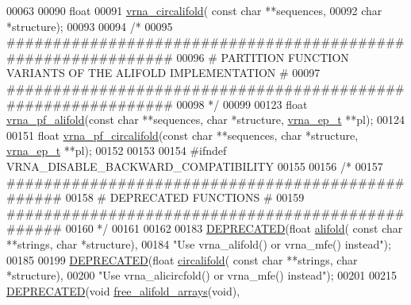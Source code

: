 \begin{DoxyCode}
00063 
00090 \textcolor{keywordtype}{float}
00091 \mbox{\hyperlink{group__consensus__mfe__fold_ga17a1be7490468c29c335ba9bffacba53}{vrna\_circalifold}}( \textcolor{keyword}{const} \textcolor{keywordtype}{char} **sequences,
00092                   \textcolor{keywordtype}{char} *structure);
00093 
00094 \textcolor{comment}{/*}
00095 \textcolor{comment}{#############################################################}
00096 \textcolor{comment}{# PARTITION FUNCTION VARIANTS OF THE ALIFOLD IMPLEMENTATION #}
00097 \textcolor{comment}{#############################################################}
00098 \textcolor{comment}{*/}
00099 
00123 \textcolor{keywordtype}{float} \mbox{\hyperlink{group__consensus__pf__fold_ga374e31a0f326b2c5da5b84e143a63f38}{vrna\_pf\_alifold}}(\textcolor{keyword}{const} \textcolor{keywordtype}{char} **sequences, \textcolor{keywordtype}{char} *structure, 
      \mbox{\hyperlink{group__struct__utils_structvrna__elem__prob__s}{vrna\_ep\_t}} **pl);
00124 
00151 \textcolor{keywordtype}{float} \mbox{\hyperlink{group__consensus__pf__fold_gab70fe6c9a78b79cc5669881720926e1d}{vrna\_pf\_circalifold}}(\textcolor{keyword}{const} \textcolor{keywordtype}{char} **sequences, \textcolor{keywordtype}{char} *structure, 
      \mbox{\hyperlink{group__struct__utils_structvrna__elem__prob__s}{vrna\_ep\_t}} **pl);
00152 
00153 
00154 \textcolor{preprocessor}{#ifndef VRNA\_DISABLE\_BACKWARD\_COMPATIBILITY}
00155 
00156 \textcolor{comment}{/*}
00157 \textcolor{comment}{#################################################}
00158 \textcolor{comment}{# DEPRECATED FUNCTIONS                          #}
00159 \textcolor{comment}{#################################################}
00160 \textcolor{comment}{*/}
00161 
00162 
00183 \mbox{\hyperlink{alifold_8h_aab347a3c03fbe8e7319551b9fa0cce4a}{DEPRECATED}}(\textcolor{keywordtype}{float} \mbox{\hyperlink{group__consensus__mfe__fold_ga4cf00f0659e5f0480335d69e797f05b1}{alifold}}( \textcolor{keyword}{const} \textcolor{keywordtype}{char} **strings, \textcolor{keywordtype}{char} *structure),
00184           \textcolor{stringliteral}{"Use vrna\_alifold() or vrna\_mfe() instead"});
00185 
00199 \mbox{\hyperlink{alifold_8h_aab347a3c03fbe8e7319551b9fa0cce4a}{DEPRECATED}}(\textcolor{keywordtype}{float} \mbox{\hyperlink{group__consensus__mfe__fold_gadbd3b0b1c144cbfb4efe704b2b260f96}{circalifold}}( \textcolor{keyword}{const} \textcolor{keywordtype}{char} **strings, \textcolor{keywordtype}{char} *structure),
00200           \textcolor{stringliteral}{"Use vrna\_alicircfold() or vrna\_mfe() instead"});
00201 
00215 \mbox{\hyperlink{alifold_8h_aab347a3c03fbe8e7319551b9fa0cce4a}{DEPRECATED}}(\textcolor{keywordtype}{void} \mbox{\hyperlink{group__consensus__mfe__fold_ga72095e4554b5d577250ea14c42acc49e}{free\_alifold\_arrays}}(\textcolor{keywordtype}{void}),

\end{DoxyCode}
